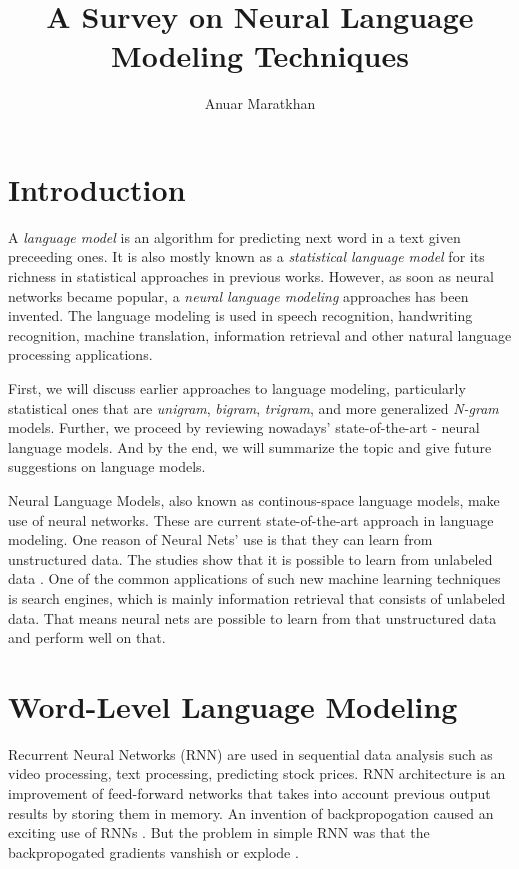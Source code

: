 \documentclass{IEEEtran}
\begin{document}
\title{A Survey on Neural Language Modeling Techniques}

\author{Anuar Maratkhan}

\maketitle

\section{Introduction}

A \textit{language model} is an algorithm for predicting next word in a text given preceeding ones. It is also mostly known as a \textit{statistical language model} for its richness in statistical approaches in previous works. However, as soon as neural networks became popular, a \textit{neural language modeling} approaches has been invented. The language modeling is used in speech recognition, handwriting recognition, machine translation, information retrieval and other natural language processing applications.

First, we will discuss earlier approaches to language modeling, particularly statistical ones that are \textit{unigram}, \textit{bigram}, \textit{trigram}, and more generalized \textit{N-gram} models. Further, we proceed by reviewing nowadays' state-of-the-art - neural language models. And by the end, we will summarize the topic and give future suggestions on language models.

Neural Language Models, also known as continous-space language models, make use of neural networks. These are current state-of-the-art approach in language modeling. One reason of Neural Nets' use is that they can learn from unstructured data. The studies show that it is possible to learn from unlabeled data \cite{unsupervised}. One of the common applications of such new machine learning techniques is search engines, which is mainly information retrieval that consists of unlabeled data. That means neural nets are possible to learn from that unstructured data and perform well on that.

\section{Word-Level Language Modeling}

Recurrent Neural Networks (RNN) are used in sequential data analysis such as video processing, text processing, predicting stock prices. RNN architecture is an improvement of feed-forward networks that takes into account previous output results by storing them in memory. An invention of backpropogation caused an exciting use of RNNs \cite{deeplearning}. But the problem in simple RNN was that the backpropogated gradients vanshish or explode \cite{deeplearning}.
\end{document}
